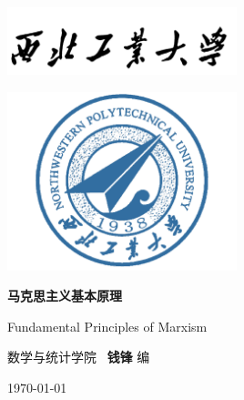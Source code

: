 \documentclass[11pt, UTF8]{book} %
\begin{document}
\pagestyle{empty}
\begin{titlepage}
    \thispagestyle{empty}
    \centering
        \vspace*{2cm}
        \includegraphics[width=0.5\textwidth]{pic/npu_2.png}\par
        \vspace{1em}
        \includegraphics[width=0.5\textwidth]{pic/npu_1.png}\par
    \vspace{1em}
        \begin{center}
            \Huge \heiti \textbf{马克思主义基本原理}

            Fundamental Principles of Marxism
        \end{center}
        \vspace{16em}
        \begin{center}
        \songti
        \kaishu 数学与统计学院 \, \heiti\textbf{钱锋} \quad \songti 编
        \vspace{0.5em}

    \today
    \end{center}
\end{titlepage}

\cleardoublepage
\maketitle
\cleardoublepage

\frontmatter
\newpage
\pagestyle{plain}
\makeatother

\pagestyle{plain}
{\tableofcontents}
\newpage
\thispagestyle{empty}
\cleardoublepage %
\end{document}
